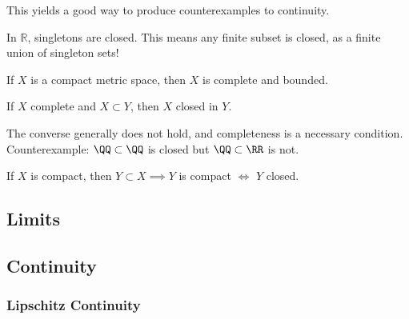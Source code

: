 \begin{proposition}[?]

This yields a good way to produce counterexamples to continuity.

\end{proposition}

In \(\mathbb{R}\), singletons are closed. This means any finite subset
is closed, as a finite union of singleton sets!

\begin{proposition}[?]

If \(X\) is a compact metric space, then \(X\) is complete and bounded.

\end{proposition}

\begin{proposition}[?]

If \(X\) complete and \(X \subset Y\), then \(X\) closed in \(Y\).

\end{proposition}

\begin{remark}

The converse generally does not hold, and completeness is a necessary
condition. Counterexample: \(\QQ\subset \QQ\) is closed but
\(\QQ\subset\RR\) is not.

\end{remark}

\begin{proposition}[?]

If \(X\) is compact, then \(Y \subset X \implies Y\) is compact \(\iff\)
\(Y\) closed.

\end{proposition}

\hypertarget{limits-1}{%
\subsection{Limits}\label{limits-1}}

\hypertarget{continuity-1}{%
\subsection{Continuity}\label{continuity-1}}

\hypertarget{lipschitz-continuity}{%
\subsubsection{Lipschitz Continuity}\label{lipschitz-continuity}}


